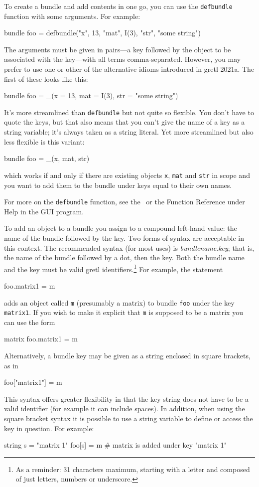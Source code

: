 To create a bundle and add contents in one go, you can use the
\texttt{defbundle} function with some arguments. For example:
\begin{code}
bundle foo = defbundle("x", 13, "mat", I(3), "str", "some string")
\end{code}
The arguments must be given in pairs---a key followed by the object to
be associated with the key---with all terms comma-separated. However,
you may prefer to use one or other of the alternative idioms
introduced in gretl 2021a. The first of these looks like this:
\begin{code}
bundle foo = _(x = 13, mat = I(3), str = "some string")
\end{code}
It's more streamlined than \texttt{defbundle} but not quite so
flexible. You don't have to quote the keys, but that also means that
you can't give the name of a key as a string variable; it's always
taken as a string literal. Yet more streamlined but also less flexible
is this variant:
\begin{code}
bundle foo = _(x, mat, str)
\end{code}
which works if and only if there are existing objects \texttt{x},
\texttt{mat} and \texttt{str} in scope and you want to add them to the
bundle under keys equal to their own names.

For more on the \texttt{defbundle} function, see the \GCR\ or the
\textsf{Function Reference} under \textsf{Help} in the GUI program.

To add an object to a bundle you assign to a compound left-hand value:
the name of the bundle followed by the key. Two forms of syntax are
acceptable in this context. The recommended syntax (for most uses) is
\textsl{bundlename}.\textsl{key}; that is, the name of the bundle
followed by a dot, then the key. Both the bundle name and the key must
be valid gretl identifiers.\footnote{As a reminder: 31 characters
  maximum, starting with a letter and composed of just letters,
  numbers or underscore.} For example, the statement
%
\begin{code}
foo.matrix1 = m
\end{code}
%
adds an object called \texttt{m} (presumably a matrix) to bundle
\texttt{foo} under the key \texttt{matrix1}. If you wish to make it
explicit that \texttt{m} is supposed to be a matrix you can use the
form
%
\begin{code}
matrix foo.matrix1 = m
\end{code}

Alternatively, a bundle key may be given as a string enclosed in
square brackets, as in
%
\begin{code}
foo["matrix1"] = m
\end{code}
%
This syntax offers greater flexibility in that the key string does not
have to be a valid identifier (for example it can include spaces). In
addition, when using the square bracket syntax it is possible to use a
string variable to define or access the key in question. For example:
%
\begin{code}
string s = "matrix 1"
foo[s] = m # matrix is added under key "matrix 1"
\end{code}

